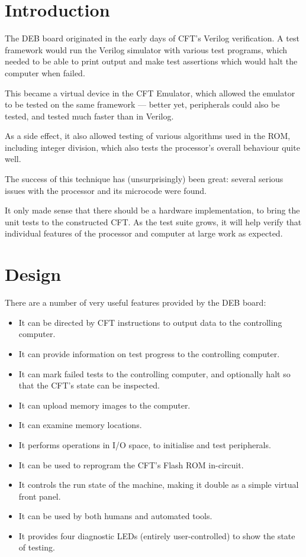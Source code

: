 \label{chap:deb}

\section{Introduction}

The \gls{DEB} board originated in the early days of CFT's
\gls{Verilog} verification. A test framework would run the Verilog
simulator with various test programs, which needed to be able to print
output and make test assertions which would halt the computer when
failed.

This became a virtual device in the CFT Emulator, which allowed the
emulator to be tested on the same framework — better yet, peripherals
could also be tested, and tested much faster than in Verilog.

As a side effect, it also allowed testing of various algorithms used
in the ROM, including integer division, which also tests the
processor's overall behaviour quite well.

The success of this technique has (unsurprisingly) been great: several
serious issues with the processor and its microcode were found.

It only made sense that there should be a hardware implementation, to
bring the unit tests to the constructed CFT. As the test suite grows,
it will help verify that individual features of the processor and
computer at large work as expected.

\section{Design}

There are a number of very useful features provided by the \gls{DEB} board:

\begin{itemize}
\item It can be directed by CFT instructions to output data to the
  controlling computer.
\item It can provide information on test progress to the controlling computer.
\item It can mark failed tests to the controlling computer, and optionally halt so that the CFT's state can be inspected.
\item It can upload memory images to the computer.
\item It can examine memory locations.
\item It performs operations in I/O space, to initialise and test peripherals.
\item It can be used to reprogram the CFT's Flash ROM in-circuit.
\item It controls the run state of the machine, making it double as a
  simple virtual front panel.
\item It can be used by both humans and automated tools.
\item It provides four diagnostic LEDs (entirely user-controlled) to
  show the state of testing.
\end{itemize}

